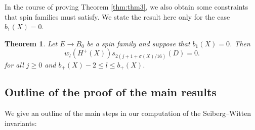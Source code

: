 \documentclass{amsart}
\newtheorem{theorem}{Theorem}[section]
\theoremstyle{definition}
\theoremstyle{remark}
\numberwithin{equation}{section}
\begin{document}
In the course of proving Theorem \ref{thm:thm3}, we also obtain some constraints that spin families must satisfy. We state the result here only for the case $b_1(X)=0$.

\begin{theorem}
Let $E \to B_0$ be a spin family and suppose that $b_1(X) = 0$. Then
\[
w_l(H^+(X))s_{2(j+1+\sigma(X)/16)}(D) = 0.
\]
for all $j \ge 0$ and $b_+(X) - 2 \le l \le b_+(X)$.
\end{theorem}

\subsection{Outline of the proof of the main results}

We give an outline of the main steps in our computation of the Seiberg--Witten invariants:
\end{document}
